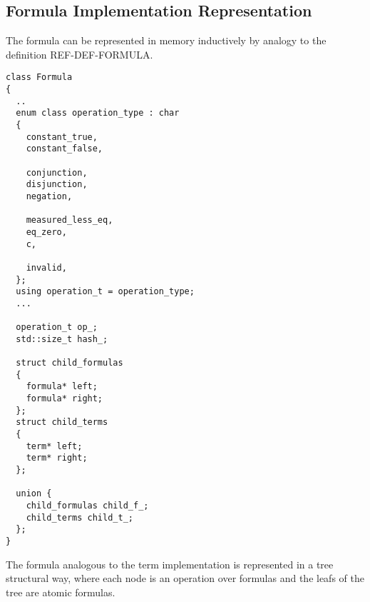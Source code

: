 \documentclass{article}
\begin{document}
	\subsection*{Formula Implementation Representation}
	The formula can be represented in memory inductively by analogy to the definition REF-DEF-FORMULA.

	\begin{lstlisting}
class Formula 
{
  ..
  enum class operation_type : char
  {
    constant_true,
    constant_false,

    conjunction,
    disjunction,
    negation,

    measured_less_eq,
    eq_zero,
    c,

    invalid,
  };
  using operation_t = operation_type;
  ...

  operation_t op_;
  std::size_t hash_;
    
  struct child_formulas
  {
    formula* left;
    formula* right;
  };
  struct child_terms
  {
    term* left;
    term* right;
  };

  union {
    child_formulas child_f_;
    child_terms child_t_;
  };
}
	\end{lstlisting}
	The formula analogous to the term implementation is represented in a tree structural way, where each node is an operation over formulas and the leafs of the tree
	are atomic formulas. 
\end{document}
